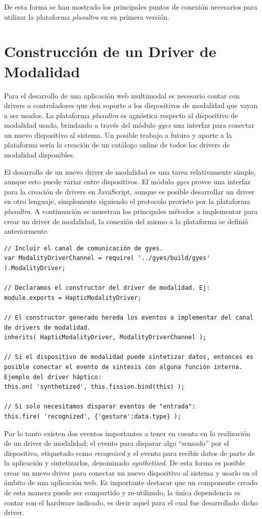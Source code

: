 De esta forma se han mostrado los principales puntos de conexión necesarios para utilizar la plataforma \emph{plusultra} en su primera versión.

\section{Construcción de un Driver de Modalidad}
Para el desarrollo de una aplicación web multimodal es necesario contar con drivers o controladores que den soporte a los dispositivos de modalidad que vayan a ser usados. La plataforma \emph{plusultra} es agnóstica respecto al dispositivo de modalidad usado, brindando a través del módulo \emph{gyes} una interfaz para conectar un nuevo dispositivo al sistema. Un posible trabajo a futuro y aporte a la plataforma sería la creación de un catálogo online de todos los drivers de modalidad disponibles. 

El desarrollo de un nuevo driver de modalidad es una tarea relativamente simple, aunque esto puede variar entre dispositivos. El módulo \emph{gyes} provee una interfaz para la creación de drivers en JavaScript, aunque es posible desarrollar un driver en otro lenguaje, simplemente siguiendo el protocolo provisto por la plataforma \emph{plusultra}.
A continuación se muestran los principales métodos a implementar para crear un driver de modalidad, la conexión del mismo a la plataforma se definió anteriormente.

\begin{lstlisting}
// Incluir el canal de comunicación de gyes.
var ModalityDriverChannel = require( '../gyes/build/gyes' ).ModalityDriver;

// Declaramos el constructor del driver de modalidad. Ej:
module.exports = HapticModalityDriver;

// El constructor generado hereda los eventos a implementar del canal de drivers de modalidad.
inherits( HapticModalityDriver, ModalityDriverChannel );

// Si el dispositivo de modalidad puede sintetizar datos, entonces es posible conectar el evento de sintesis con alguna función interna. Ejemplo del driver háptico:
this.on( 'synthetized', this.fission.bind(this) );

// Si solo necesitamos disparar eventos de "entrada":
this.fire( 'recognized', {'gesture':data.type} );

\end{lstlisting}

Por lo tanto existen dos eventos importantes a tener en cuenta en la realización de un driver de modalidad; el evento para disparar algo ``sensado'' por el dispositivo, etiquetado como \emph{recognized} y el evento para recibir datos de parte de la aplicación y sintetizarlos, denominado \emph{synthetized}.
De esta forma es posible crear un nuevo driver para conectar un nuevo dispositivo al sistema y usarlo en el ámbito de una aplicación web. Es importante destacar que un componente creado de esta manera puede ser compartido y re-utilizado, la única dependencia es contar con el hardware indicado, es decir aquel para el cual fue desarrollado dicho driver. 

